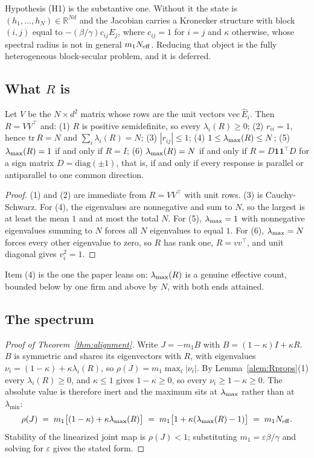 Hypothesis (H1) is the substantive one. Without it the state is $(h_1,\ldots,h_N) \in \mathbb{R}^{Nd}$ and the Jacobian carries a Kronecker structure with block $(i,j)$ equal to $-(\beta/\gamma)c_{ij}E_j$, where $c_{ij}=1$ for $i=j$ and $\kappa$ otherwise, whose spectral radius is not in general $m_1 N_{\mathrm{eff}}$. Reducing that object is the fully heterogeneous block-secular problem, and it is deferred.

\subsection{What \texorpdfstring{$R$}{R} is}

\begin{alemma}
\label{alem:Rprops}
Let $V$ be the $N \times d^2$ matrix whose rows are the unit vectors $\mathrm{vec}\,\hat{E}_i$. Then $R = VV^{\top}$ and:
(1) $R$ is positive semidefinite, so every $\lambda_i(R)\geq 0$;
(2) $r_{ii}=1$, hence $\mathrm{tr}\,R = N$ and $\sum_i \lambda_i(R) = N$;
(3) $|r_{ij}|\leq 1$;
(4) $1 \leq \lambda_{\max}(R) \leq N$;
(5) $\lambda_{\max}(R)=1$ if and only if $R=I$;
(6) $\lambda_{\max}(R)=N$ if and only if $R = D\mathbf{1}\mathbf{1}^{\top}D$ for a sign matrix $D=\mathrm{diag}(\pm 1)$, that is, if and only if every response is parallel or antiparallel to one common direction.
\end{alemma}

\begin{proof}
(1) and (2) are immediate from $R=VV^{\top}$ with unit rows. (3) is Cauchy-Schwarz. For (4), the eigenvalues are nonnegative and sum to $N$, so the largest is at least the mean $1$ and at most the total $N$. For (5), $\lambda_{\max}=1$ with nonnegative eigenvalues summing to $N$ forces all $N$ eigenvalues to equal $1$. For (6), $\lambda_{\max}=N$ forces every other eigenvalue to zero, so $R$ has rank one, $R=vv^{\top}$, and unit diagonal gives $v_i^2=1$.
\end{proof}

Item (4) is the one the paper leans on: $\lambda_{\max}(R)$ is a genuine effective count, bounded below by one firm and above by $N$, with both ends attained.

\subsection{The spectrum}

\begin{proof}[Proof of Theorem~\ref{thm:alignment}]
Write $J = -m_1 B$ with $B = (1-\kappa)I + \kappa R$. $B$ is symmetric and shares its eigenvectors with $R$, with eigenvalues $\nu_i = (1-\kappa) + \kappa\lambda_i(R)$, so $\rho(J) = m_1 \max_i |\nu_i|$. By Lemma~\ref{alem:Rprops}(1) every $\lambda_i(R)\geq 0$, and $\kappa \leq 1$ gives $1-\kappa\geq 0$, so every $\nu_i \geq 1-\kappa \geq 0$. The absolute value is therefore inert and the maximum sits at $\lambda_{\max}$ rather than at $\lambda_{\min}$:
\[
  \rho(J) \;=\; m_1\big[(1-\kappa) + \kappa\lambda_{\max}(R)\big] \;=\; m_1\big[1 + \kappa(\lambda_{\max}(R)-1)\big] \;=\; m_1 N_{\mathrm{eff}}.
\]
Stability of the linearized joint map is $\rho(J)<1$; substituting $m_1 = \varepsilon\beta/\gamma$ and solving for $\varepsilon$ gives the stated form.
\end{proof}

